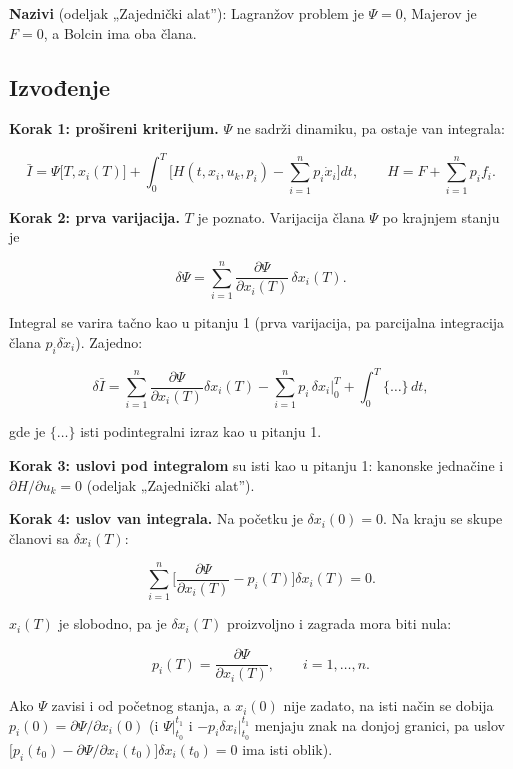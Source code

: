\documentclass[11pt,a4paper,parskip=half,headsepline,numbers=noenddot]{scrartcl}
\begin{document}
\textbf{Nazivi} (odeljak „Zajednički alat''): Lagranžov problem je \(\Psi = 0\), Majerov je \(F = 0\), a Bolcin ima oba člana.

\subsection{Izvođenje}

\textbf{Korak 1: prošireni kriterijum.} \(\Psi\) ne sadrži dinamiku, pa ostaje van integrala:

\[\bar I = \Psi\big[T, x_i(T)\big] + \int_0^T\Big[H(t, x_i, u_k, p_i) - \sum_{i=1}^n p_i\dot x_i\Big]dt, \qquad H = F + \sum_{i=1}^n p_i f_i .\]

\textbf{Korak 2: prva varijacija.} \(T\) je poznato. Varijacija člana \(\Psi\) po krajnjem stanju je

\[\delta\Psi = \sum_{i=1}^n \frac{\partial\Psi}{\partial x_i(T)}\,\delta x_i(T) .\]

Integral se varira tačno kao u pitanju 1 (prva varijacija, pa parcijalna integracija člana \(p_i\delta\dot x_i\)). Zajedno:

\[\delta\bar I = \sum_{i=1}^n\frac{\partial\Psi}{\partial x_i(T)}\delta x_i(T) - \sum_{i=1}^n p_i\,\delta x_i\Big|_0^T + \int_0^T\{\dots\}\,dt ,\]

gde je \(\{\dots\}\) isti podintegralni izraz kao u pitanju 1.

\textbf{Korak 3: uslovi pod integralom} su isti kao u pitanju 1: kanonske jednačine i \(\partial H/\partial u_k = 0\) (odeljak „Zajednički alat'').

\textbf{Korak 4: uslov van integrala.} Na početku je \(\delta x_i(0) = 0\). Na kraju se skupe članovi sa \(\delta x_i(T)\):

\[\sum_{i=1}^n\Big[\frac{\partial\Psi}{\partial x_i(T)} - p_i(T)\Big]\delta x_i(T) = 0 .\]

\(x_i(T)\) je slobodno, pa je \(\delta x_i(T)\) proizvoljno i zagrada mora biti nula:

\begin{kljucna}
\[p_i(T) = \frac{\partial\Psi}{\partial x_i(T)}, \qquad i = 1, \dots, n .\]

Ako \(\Psi\) zavisi i od početnog stanja, a \(x_i(0)\) nije zadato, na isti način se dobija \(p_i(0) = \partial\Psi/\partial x_i(0)\) (i \(\Psi\big|_{t_0}^{t_1}\) i \(-p_i\delta x_i\big|_{t_0}^{t_1}\) menjaju znak na donjoj granici, pa uslov \(\big[p_i(t_0) - \partial\Psi/\partial x_i(t_0)\big]\delta x_i(t_0) = 0\) ima isti oblik).
\end{kljucna}
\end{document}
